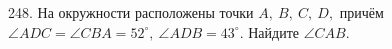 248. На окружности расположены точки $A,\ B,\ C,\ D,$ причём $\angle ADC=\angle CBA=52^\circ,\
\angle ADB=43^\circ.$ Найдите $\angle CAB.$\\
